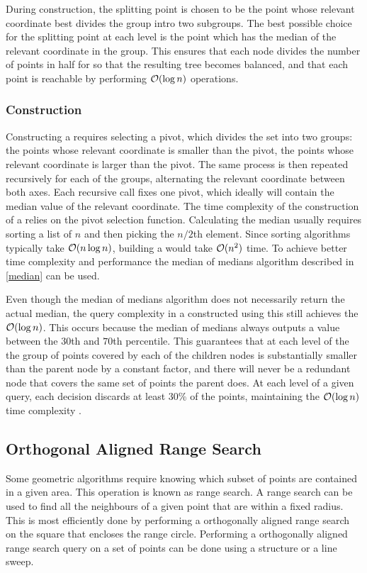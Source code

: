 During construction, the splitting point is chosen to be the point whose relevant coordinate best divides the group intro two subgroups. The best possible choice for the splitting point at each level is the point which has the median of the relevant coordinate in the group. This ensures that each node divides the number of points in half for so that the resulting tree becomes balanced, and that each point is reachable by performing $\mathcal{O}(\log{n})$ operations.


\subsubsection*{Construction}
Constructing a \kdtree requires selecting a pivot, which divides the set into two groups: the points whose relevant coordinate is smaller than the pivot, the points whose relevant coordinate is larger than the pivot. The same process is then repeated recursively for each of the groups, alternating the relevant coordinate between both axes. Each recursive call fixes one pivot, which ideally will contain the median value of the relevant coordinate. The time complexity of the construction of a \kdtree relies on the pivot selection function. Calculating the median usually requires sorting a list of $n$ and then picking the $n/2$th element. Since sorting algorithms typically take $\mathcal{O}(n \log{n})$, building a \kdtree would take $\mathcal{O}(n^2)$ time. To achieve better time complexity and performance the median of medians algorithm described in \ref{median} can be used.

Even though the median of medians algorithm does not necessarily return the actual median, the query complexity in a \kdtree constructed using this still achieves the $\mathcal{O}(\log{n})$. This occurs because the median of medians always outputs a value between the $30$th and $70$th percentile. This guarantees that at each level of the \kdtree the group of points covered by each of the children nodes is substantially smaller than the parent node by a constant factor, and there will never be a redundant node that covers the same set of points the parent does. At each level of a given query, each decision discards at least 30\% of the points, maintaining the $\mathcal{O}(\log{n})$ time complexity \cite{kdmedian}.

\subsection{Orthogonal Aligned Range Search}
Some geometric algorithms require knowing which subset of points are contained in a given area. This operation is known as range search. A range search can be used to find all the neighbours of a given point that are within a fixed radius. This is most efficiently done by performing a orthogonally aligned range search on the square that encloses the range circle. Performing a orthogonally aligned range search query on a set of points can be done using a \kdtree structure or a line sweep.

